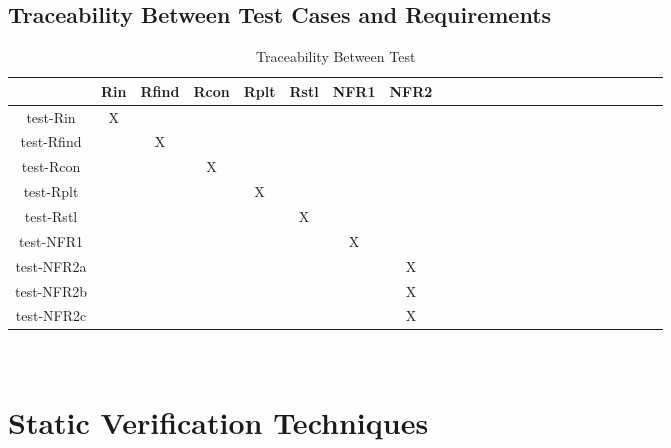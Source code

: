 \documentclass[12pt, titlepage]{article}
\begin{document}
\subsection{Traceability Between Test Cases and Requirements}

\begin{table}[h]
	\centering
	\begin{tabular}{|c|c|c|c|c|c|c|c|c|c|c|c|c|c|c|c|c|c|c|c|c|c|c|c|}
		\hline        
		& Rin& Rfind & Rcon & Rplt & Rstl & NFR1 & NFR2 \\
		\hline
		test-Rin     &X & & & & & &  \\ \hline
		test-Rfind    & &X & & & & &  \\ \hline
		test-Rcon    & & &X & & & & \\ \hline 
		test-Rplt    & & & &X & & &   \\ \hline 
		test-Rstl    & & & & &X & &   \\ \hline 
		test-NFR1    & & & & & &X &   \\ \hline 
		test-NFR2a  & & & & & & &X   \\ \hline 
		test-NFR2b  & & & & & & &X   \\ \hline 
		test-NFR2c  & & & & & & &X \\
		\hline
	\end{tabular}\\
	\caption{Traceability Between Test }
	\label{Table:D_1}
\end{table} 


\section{Static Verification Techniques}
\end{document}
